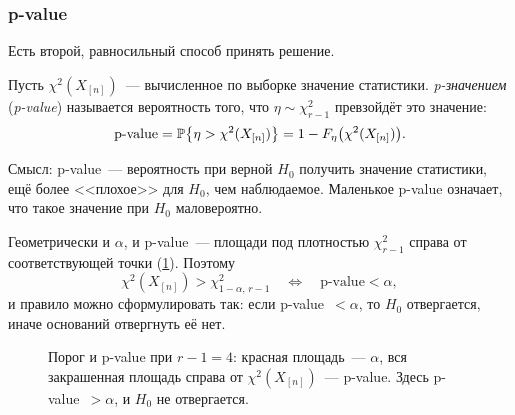 \subsubsection{p-value}

Есть второй, равносильный способ принять решение.

\begin{definition}
  Пусть $\chi^2(X_{[n]})$~--- вычисленное по выборке значение статистики.
  \emph{p-значением} (\emph{p-value}) называется вероятность того, что
  $\eta \sim \chi^2_{r-1}$ превзойдёт это значение:
  \[
    \text{p-value} = \P\bigl\{\eta > \chi^2(X_{[n]})\bigr\} = 1 - F_\eta\bigl(\chi^2(X_{[n]})\bigr).
  \]
\end{definition}

Смысл: p-value~--- вероятность при верной $H_0$ получить значение статистики, ещё более
<<плохое>> для $H_0$, чем наблюдаемое. Маленькое p-value означает, что такое значение
при $H_0$ маловероятно.

Геометрически и $\alpha$, и p-value~--- площади под плотностью $\chi^2_{r-1}$ справа от
соответствующей точки (\cref{lec04:fig:chi2-test}). Поэтому
\[
  \chi^2(X_{[n]}) > \chi^2_{1-\alpha,\, r-1}
  \quad\Longleftrightarrow\quad
  \text{p-value} < \alpha,
\]
и правило можно сформулировать так: если p-value~$< \alpha$, то $H_0$ отвергается,
иначе оснований отвергнуть её нет.

\begin{figure}[h]
  \centering
  \caption{Порог и p-value при $r - 1 = 4$: красная площадь~--- $\alpha$, вся закрашенная
           площадь справа от $\chi^2(X_{[n]})$~--- p-value. Здесь p-value~$> \alpha$,
           и $H_0$ не отвергается.}
  \label{lec04:fig:chi2-test}
\end{figure}

